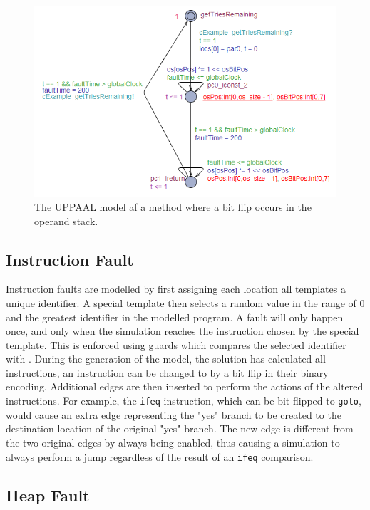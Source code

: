 \begin{figure}[H]
\centering
\includegraphics{figures/reportExamples/opstackRewrite.PNG}
\caption{The UPPAAL model af a method where a bit flip occurs in the operand stack.}
\label{fig:opstackFlip}
\end{figure}
\subsection{Instruction Fault}
Instruction faults are modelled by first assigning each location all templates a unique identifier. A special template then selects a random value in the range of $0$ and the greatest identifier in the modelled program. A fault will only happen once, and only when the simulation reaches the instruction chosen by the special template. This is enforced using guards which compares the selected identifier with . During the generation of the model, the solution has calculated all instructions, an instruction can be changed to by a bit flip in their binary encoding. Additional edges are then inserted to perform the actions of the altered instructions. For example, the \texttt{ifeq} instruction, which can be bit flipped to \texttt{goto}, would cause an extra edge representing the "yes" branch to be created to the destination location of the original "yes" branch. The new edge is different from the two original edges by always being enabled, thus causing a simulation to always perform a jump regardless of the result of an \texttt{ifeq} comparison.
\subsection{Heap Fault}